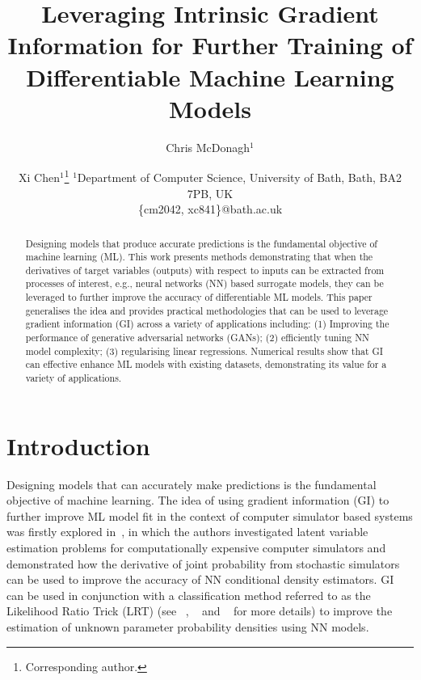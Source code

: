 \documentclass{article}
\title{Leveraging Intrinsic Gradient Information for Further Training of Differentiable Machine Learning Models}
\author{
Chris McDonagh$^1$\and
Xi Chen$^1$\footnote{Corresponding author.}
\affiliations
$^1$Department of Computer Science, University of Bath, Bath, BA2 7PB, UK\\
\emails
\{cm2042, xc841\}@bath.ac.uk
}
\begin{document}
\maketitle

\begin{abstract}
Designing models that produce accurate predictions is the fundamental objective of machine learning (ML). This work presents methods demonstrating that when the derivatives of target variables (outputs) with respect to inputs can be extracted from processes of interest, e.g., neural networks (NN) based surrogate models, they can be leveraged to further improve the accuracy of differentiable ML models. This paper generalises the idea and provides practical methodologies that can be used to leverage gradient information (GI) across a variety of applications including: (1) Improving the performance of generative adversarial networks (GANs); (2) efficiently tuning NN model complexity; (3) regularising linear regressions. Numerical results show that GI can effective enhance ML models with existing datasets, demonstrating its value for a variety of applications.
\end{abstract}

\section{Introduction}

Designing models that can accurately make predictions is the fundamental objective of machine learning. The idea of using gradient information (GI) to further improve ML model fit in the context of computer simulator based systems was firstly explored in~\cite{Brehmer5242}, in which the authors investigated latent variable estimation problems for computationally expensive computer simulators and demonstrated how the derivative of joint probability from stochastic simulators can be used to improve the accuracy of NN conditional density estimators. GI can be used in conjunction with a classification method referred to as the Likelihood Ratio Trick (LRT) (see ~\cite{tran2017hierarchical}, ~\cite{gutmann2018likelihood} and ~\cite{Brehmer5242} for more details) to improve the estimation of unknown parameter probability densities using NN models. 

\end{document}
